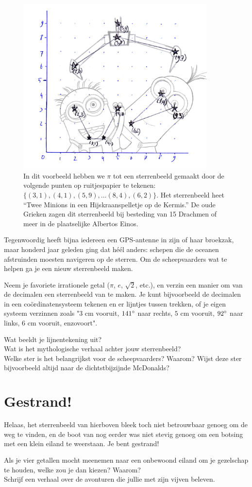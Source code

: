 \documentclass{weekprobleem}
\newcommand{\textgreek}[1]{\begingroup\fontencoding{LGR}\selectfont#1\endgroup}
\begin{document}
\begin{figure}
	\centering
	\includegraphics[width=10cm]{pi}
	\caption{\small{In dit voorbeeld hebben we $\pi$ tot een sterrenbeeld gemaakt door de volgende punten op ruitjespapier te tekenen: $\{(3,1), (4,1), (5,9), \ldots (8,4), (6,2)\}$. Het sterrenbeeld heet ``Twee Minions in een Hijskraanspelletje op de Kermis.'' De oude Grieken zagen dit sterrenbeeld bij besteding van 15 Drachmen of meer in de plaatselijke \textgreek{Albertos \<Einos}.}}
\end{figure}
Tegenwoordig heeft bijna iedereen een GPS-antenne in zijn of haar broekzak, maar honderd jaar geleden ging dat héél anders: schepen die de oceanen afstruinden moesten navigeren op de sterren.
Om de scheepvaarders wat te helpen ga je een nieuw sterrenbeeld maken.

Neem je favoriete irrationele getal ($\pi$, $e$, $\sqrt{2}$, etc.), en verzin een manier om van de decimalen een sterrenbeeld van te maken.
Je kunt bijvoorbeeld de decimalen in een coördinatensysteem tekenen en er lijntjes tussen trekken, of je eigen systeem verzinnen zoals "$3$ cm vooruit, $141{\degree}$ naar rechts, $5$ cm vooruit, $92{\degree}$ naar links, $6$ cm vooruit, enzovoort".

Wat beeldt je lijnentekening uit?\\
Wat is het mythologische verhaal achter jouw sterrenbeeld?\\
Welke ster is het belangrijkst voor de scheepvaarders? Waarom? Wijst deze ster bijvoorbeeld altijd naar de dichtstbijzijnde McDonalds?


\section*{Gestrand!}

Helaas, het sterrenbeeld van hierboven bleek toch niet betrouwbaar genoeg om de weg te vinden, en de boot van nog eerder was niet stevig genoeg om een botsing met een klein eiland te weerstaan. Je bent gestrand!

Als je vier getallen mocht meenemen naar een onbewoond eiland om je gezelschap te houden, welke zou je dan kiezen? Waarom?\\
Schrijf een verhaal over de avonturen die jullie met zijn vijven beleven.
\end{document}
